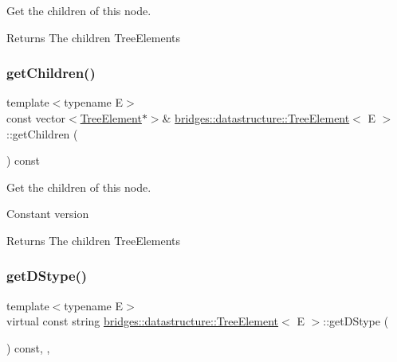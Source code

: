 Get the children of this node. 

\begin{DoxyReturn}{Returns}
The children Tree\+Elements 
\end{DoxyReturn}
\mbox{\label{classbridges_1_1datastructure_1_1_tree_element_a1fc634a6eaab3800f925429ace209469}} 
\subsubsection{\texorpdfstring{get\+Children()}{getChildren()}\hspace{0.1cm}{\footnotesize\ttfamily [2/2]}}
{\footnotesize\ttfamily template$<$typename E$>$ \\
const vector$<$\hyperlink{classbridges_1_1datastructure_1_1_tree_element}{Tree\+Element}$\ast$$>$\& \hyperlink{classbridges_1_1datastructure_1_1_tree_element}{bridges\+::datastructure\+::\+Tree\+Element}$<$ E $>$\+::get\+Children (\begin{DoxyParamCaption}{ }\end{DoxyParamCaption}) const\hspace{0.3cm}{\ttfamily [inline]}}



Get the children of this node. 

Constant version

\begin{DoxyReturn}{Returns}
The children Tree\+Elements 
\end{DoxyReturn}
\mbox{\label{classbridges_1_1datastructure_1_1_tree_element_a897f34ea284da45e1dc869c3e3b6c9a4}} 
\subsubsection{\texorpdfstring{get\+D\+Stype()}{getDStype()}}
{\footnotesize\ttfamily template$<$typename E$>$ \\
virtual const string \hyperlink{classbridges_1_1datastructure_1_1_tree_element}{bridges\+::datastructure\+::\+Tree\+Element}$<$ E $>$\+::get\+D\+Stype (\begin{DoxyParamCaption}{ }\end{DoxyParamCaption}) const\hspace{0.3cm}{\ttfamily [inline]}, {\ttfamily [override]}, {\ttfamily [virtual]}}



